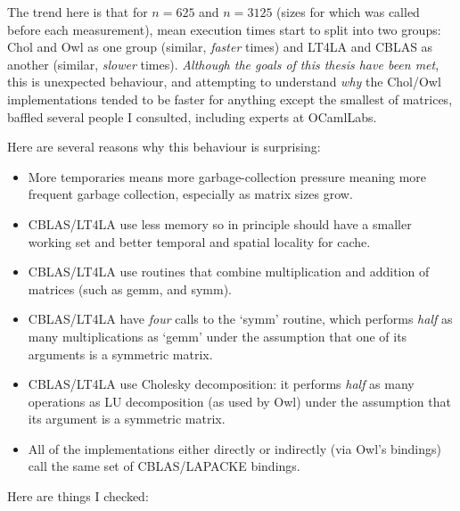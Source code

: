 The trend here is that for $n=625$ and $n=3125$ (sizes for which
 was called before each measurement), mean execution times
start to split into two groups: Chol and Owl as one group (similar,
\emph{faster} times) and LT4LA and CBLAS as another (similar, \emph{slower}
times). \emph{Although the goals of this thesis have been met}, this is
unexpected behaviour, and attempting to understand \emph{why} the Chol/Owl
implementations tended to be faster for anything except the smallest of
matrices, baffled several people I consulted, including experts at OCamlLabs.

Here are several reasons why this behaviour is surprising:

\begin{itemize}

    \item More temporaries means more garbage-collection pressure meaning
        more frequent garbage collection, especially as matrix sizes grow.

    \item CBLAS/LT4LA use less memory so in principle should have a smaller
        working set and better temporal and spatial locality for cache.

    \item CBLAS/LT4LA use routines that combine multiplication and addition
        of matrices (such as gemm, and symm).

    \item CBLAS/LT4LA have \emph{four} calls to the `symm' routine, which
        performs \emph{half} as many multiplications as `gemm' under the
        assumption that one of its arguments is a symmetric matrix.

    \item CBLAS/LT4LA use Cholesky decomposition: it performs \emph{half} as
        many operations as LU decomposition (as used by Owl) under the
        assumption that its argument is a symmetric matrix.

    \item All of the implementations either directly or indirectly (via Owl's
        bindings) call the same set of CBLAS/LAPACKE bindings.

\end{itemize}

Here are things I checked:

